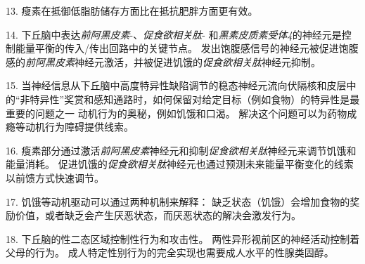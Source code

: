 13. 瘦素在抵御低脂肪储存方面比在抵抗肥胖方面更有效。 


14. 下丘脑中表达\textit{前阿黑皮素}-、\textit{促食欲相关肽}- 和\textit{黑素皮质素受体4}的神经元是控制能量平衡的传入/传出回路中的关键节点。
发出饱腹感信号的神经元被促进饱腹感的\textit{前阿黑皮素}神经元激活，并被促进饥饿的\textit{促食欲相关肽}神经元抑制。


15. 当神经信息从下丘脑中高度特异性缺陷调节的稳态神经元流向伏隔核和皮层中的“非特异性”奖赏和感知通路时，如何保留对给定目标（例如食物）的特异性是最重要的问题之一 动机行为的奥秘，例如饥饿和口渴。
解决这个问题可以为药物成瘾等动机行为障碍提供线索。 


16. 瘦素部分通过激活\textit{前阿黑皮素}神经元和抑制\textit{促食欲相关肽}神经元来调节饥饿和能量消耗。
促进饥饿的\textit{促食欲相关肽}神经元也通过预测未来能量平衡变化的线索以前馈方式快速调节。


17. 饥饿等动机驱动可以通过两种机制来解释：
缺乏状态（饥饿）会增加食物的奖励价值，或者缺乏会产生厌恶状态，而厌恶状态的解决会激发行为。 


18. 下丘脑的性二态区域控制性行为和攻击性。
两性异形视前区的神经活动控制着父母的行为。
成人特定性别行为的完全实现也需要成人水平的性腺类固醇。

